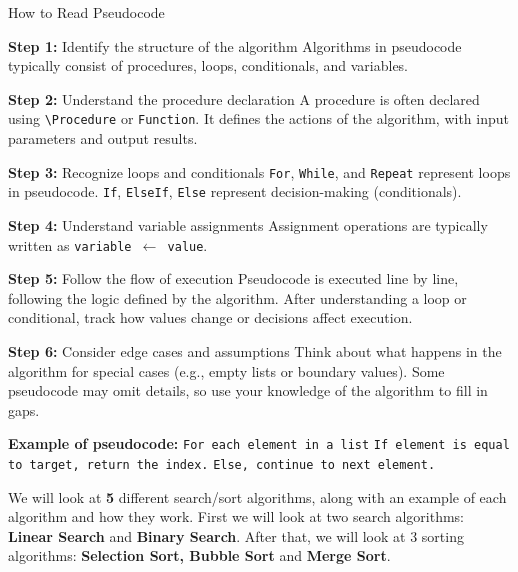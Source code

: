 \documentclass[a4paper,12pt]{article}
\begin{document}
\begin{algorithm}
\caption{How to Read Pseudocode}
\begin{algorithmic}[1]
    \State \textbf{Step 1:} Identify the structure of the algorithm
    \State \quad Algorithms in pseudocode typically consist of procedures, loops, conditionals, and variables.
    
    \State \textbf{Step 2:} Understand the procedure declaration
    \State \quad A procedure is often declared using \texttt{\textbackslash Procedure} or \texttt{Function}. 
    \State \quad It defines the actions of the algorithm, with input parameters and output results.
    
    \State \textbf{Step 3:} Recognize loops and conditionals
    \State \quad \texttt{For}, \texttt{While}, and \texttt{Repeat} represent loops in pseudocode.
    \State \quad \texttt{If}, \texttt{ElseIf}, \texttt{Else} represent decision-making (conditionals).
    
    \State \textbf{Step 4:} Understand variable assignments
    \State \quad Assignment operations are typically written as \texttt{variable $\gets$ value}.
    
    \State \textbf{Step 5:} Follow the flow of execution
    \State \quad Pseudocode is executed line by line, following the logic defined by the algorithm.
    \State \quad After understanding a loop or conditional, track how values change or decisions affect execution.
    
    \State \textbf{Step 6:} Consider edge cases and assumptions
    \State \quad Think about what happens in the algorithm for special cases (e.g., empty lists or boundary values).
    \State \quad Some pseudocode may omit details, so use your knowledge of the algorithm to fill in gaps.
    
\State \textbf{Example of pseudocode:}
    \State \quad \texttt{For each element in a list}
    \State \quad \texttt{If element is equal to target, return the index.}
    \State \quad \texttt{Else, continue to next element.}
\EndProcedure

\end{algorithmic}
\end{algorithm}

We will look at \textbf{5} different search/sort algorithms, along with an example of each algorithm and how they work. First we will look at two search algorithms: \textbf{Linear Search} and \textbf{Binary Search}. After that, we will look at 3 sorting algorithms: \textbf{Selection Sort, Bubble Sort} and \textbf{Merge Sort}.
\end{document}
